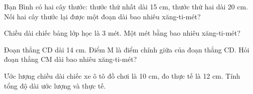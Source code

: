 \begin{ex} %
Bạn Bình có hai cây thước: thước thứ nhất dài 15 cm, thước thứ hai dài 20 cm. Nối hai cây thước lại được một đoạn dài bao nhiêu xăng-ti-mét?
\end{ex}

\begin{ex} %
Chiều dài chiếc bảng lớp học là 3 mét. Một mét bằng bao nhiêu xăng-ti-mét?
\end{ex}

\begin{ex} %
Đoạn thẳng CD dài 14 cm. Điểm M là điểm chính giữa của đoạn thẳng CD. Hỏi đoạn thẳng CM dài bao nhiêu xăng-ti-mét?
\end{ex}

\begin{ex} %
Ước lượng chiều dài chiếc xe ô tô đồ chơi là 10 cm, đo thực tế là 12 cm. Tính tổng độ dài ước lượng và thực tế.
\end{ex}
